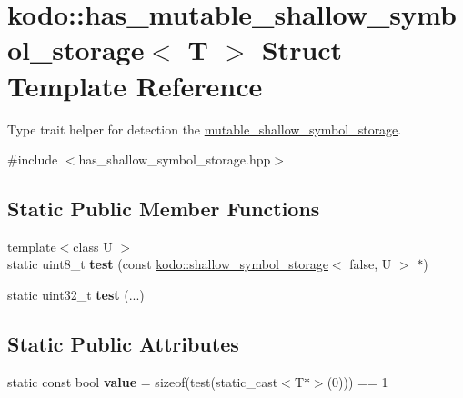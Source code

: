 \hypertarget{structkodo_1_1has__mutable__shallow__symbol__storage}{\section{kodo\-:\-:has\-\_\-mutable\-\_\-shallow\-\_\-symbol\-\_\-storage$<$ T $>$ Struct Template Reference}
\label{structkodo_1_1has__mutable__shallow__symbol__storage}
}


Type trait helper for detection the \hyperlink{classkodo_1_1mutable__shallow__symbol__storage}{mutable\-\_\-shallow\-\_\-symbol\-\_\-storage}.  




{\ttfamily \#include $<$has\-\_\-shallow\-\_\-symbol\-\_\-storage.\-hpp$>$}

\subsection*{Static Public Member Functions}
\begin{DoxyCompactItemize}
\item 
\hypertarget{structkodo_1_1has__mutable__shallow__symbol__storage_ac861356f950db95b986075992003b219}{{\footnotesize template$<$class U $>$ }\\static uint8\-\_\-t {\bfseries test} (const \hyperlink{classkodo_1_1shallow__symbol__storage}{kodo\-::shallow\-\_\-symbol\-\_\-storage}$<$ false, U $>$ $\ast$)}\label{structkodo_1_1has__mutable__shallow__symbol__storage_ac861356f950db95b986075992003b219}

\item 
\hypertarget{structkodo_1_1has__mutable__shallow__symbol__storage_af053c31f569532c663699c01fab437da}{static uint32\-\_\-t {\bfseries test} (...)}\label{structkodo_1_1has__mutable__shallow__symbol__storage_af053c31f569532c663699c01fab437da}

\end{DoxyCompactItemize}
\subsection*{Static Public Attributes}
\begin{DoxyCompactItemize}
\item 
\hypertarget{structkodo_1_1has__mutable__shallow__symbol__storage_a4523495c51d9e6b683cdc8ed12ea4319}{static const bool {\bfseries value} = sizeof(test(static\-\_\-cast$<$T$\ast$$>$(0))) == 1}\label{structkodo_1_1has__mutable__shallow__symbol__storage_a4523495c51d9e6b683cdc8ed12ea4319}

\end{DoxyCompactItemize}


